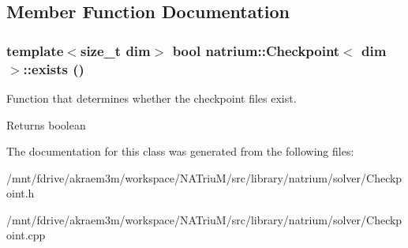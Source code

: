 \subsection{Member Function Documentation}
\hypertarget{classnatrium_1_1Checkpoint_a43f7d305056ef5eab7a2efea2cdaebe5}{
\subsubsection[{exists}]{\setlength{\rightskip}{0pt plus 5cm}template$<$size\_\-t dim$>$ bool {\bf natrium::Checkpoint}$<$ dim $>$::exists ()}}
\label{classnatrium_1_1Checkpoint_a43f7d305056ef5eab7a2efea2cdaebe5}


Function that determines whether the checkpoint files exist. \begin{DoxyReturn}{Returns}
boolean 
\end{DoxyReturn}


The documentation for this class was generated from the following files:\begin{DoxyCompactItemize}
\item 
/mnt/fdrive/akraem3m/workspace/NATriuM/src/library/natrium/solver/Checkpoint.h\item 
/mnt/fdrive/akraem3m/workspace/NATriuM/src/library/natrium/solver/Checkpoint.cpp\end{DoxyCompactItemize}
